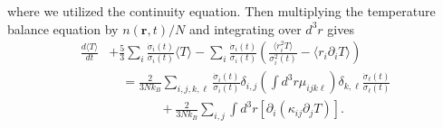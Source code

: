 \documentclass[reprint, amsmath, amssymb, aps, superscriptaddress]{revtex4-1}
\begin{document}
where we utilized the continuity equation. Then multiplying the temperature balance equation by $n(\boldsymbol{r}, t) / N$ and integrating over $d^3 r$ gives 
\begin{align} \label{eq:averaged_T_diffEQ} 
    \frac{ d \langle T \rangle }{ d t }
    &+ 
    \frac{ 5 }{ 3 } 
    \sum_i 
    \frac{ \dot{\sigma}_i(t) }{ \sigma_i(t) }
    \langle T \rangle
    -
    \sum_i
    \frac{ \dot{\sigma}_i(t) }{ \sigma_i(t) }
    \left(
    \frac{ \langle r_i^2 T \rangle }{ \sigma_i^2(t) }
    -
    \langle r_i \partial_i T \rangle
    \right) \nonumber\\
    &\quad = 
    \frac{ 2 }{ 3 N k_B }
    \sum_{i, j, k, \ell} 
    \frac{ \dot{\sigma}_i(t) }{ \sigma_i(t) }
    \delta_{ i, j }
    \left( \int d^3 r \mu_{i j k \ell} \right)
    \delta_{ k, \ell }
    \frac{ \dot{\sigma}_{\ell}(t) }{ \sigma_{\ell}(t) } 
    \nonumber\\ 
    &\quad\quad\quad\quad +
    \frac{ 2 }{ 3 N k_B }
    \sum_{i, j}
    \int d^3 r \left[ \partial_i ( \kappa_{i j} \partial_j T ) \right] . 
\end{align}
\end{document}
